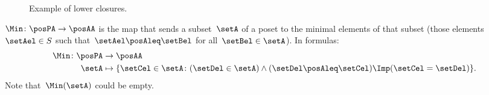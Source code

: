 \begin{figure*}[h!]
    \centering
    \caption{Example of lower closures.}
    \label{fig:examplebatt}
\end{figure*}


\begin{definition}[Min]
    \label{def:Min}
    $\Min \colon \posPA \to \posAA$ is the map that sends a subset~$\setA$ of a poset to the minimal elements of that subset (those elements~$\setAel \in S$ such that~$\setAel \posAleq \setBel$ for all~$\setBel \in \setA$).
    In formulas:
    \begin{equation*}
        \begin{aligned}
            \Min \colon \posPA &\to \posAA\\
            \setA&\mapsto \{ \setCel\in \setA\colon (\setDel\in \setA)\wedge(\setDel\posAleq \setCel)\Imp (\setCel=\setDel)\}.
        \end{aligned}
    \end{equation*}
    Note that~$\Min(\setA)$ could be empty.
\end{definition}

